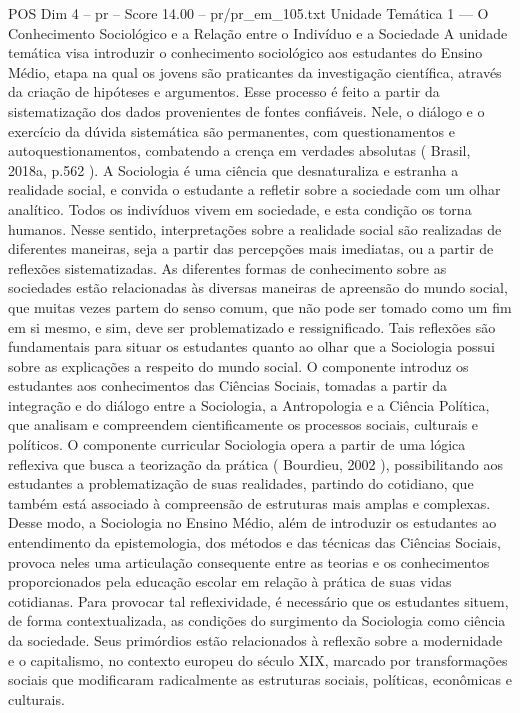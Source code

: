 \begin{textsample}{POS Dim 4 – pr – Score 14.00 – pr/pr\_em\_105.txt}  \label{ex:f4_pos_181}
Unidade Temática 1 — O Conhecimento Sociológico e a Relação entre o Indivíduo e a Sociedade A unidade temática visa introduzir o conhecimento sociológico aos estudantes do Ensino Médio, etapa na qual os jovens são praticantes da investigação científica, através da criação de hipóteses e argumentos.
Esse processo é feito a partir da sistematização dos dados provenientes de fontes confiáveis.
Nele, o diálogo e o exercício da dúvida sistemática são permanentes, com questionamentos e autoquestionamentos, combatendo a crença em verdades absolutas ( Brasil, 2018a, p.562 ).
A Sociologia é uma ciência que desnaturaliza e estranha a realidade social, e convida o estudante a refletir sobre a sociedade com um olhar analítico.
Todos os indivíduos vivem em sociedade, e esta condição os torna humanos.
Nesse sentido, interpretações sobre a realidade social são realizadas de diferentes maneiras, seja a partir das percepções mais imediatas, ou a partir de reflexões sistematizadas.
As diferentes formas de conhecimento sobre as sociedades estão relacionadas às diversas maneiras de apreensão do mundo social, que muitas vezes partem do senso comum, que não pode ser tomado como um fim em si mesmo, e sim, deve ser problematizado e ressignificado.
Tais reflexões são fundamentais para situar os estudantes quanto ao olhar que a Sociologia possui sobre as explicações a respeito do mundo social.
O componente introduz os estudantes aos conhecimentos das Ciências Sociais, tomadas a partir da integração e do diálogo entre a Sociologia, a Antropologia e a Ciência Política, que analisam e compreendem cientificamente os processos sociais, culturais e políticos.
O componente curricular Sociologia opera a partir de uma lógica reflexiva que busca a teorização da prática ( Bourdieu, 2002 ), possibilitando aos estudantes a problematização de suas realidades, partindo do cotidiano, que também está associado à compreensão de estruturas mais amplas e complexas.
Desse modo, a Sociologia no Ensino Médio, além de introduzir os estudantes ao entendimento da epistemologia, dos métodos e das técnicas das Ciências Sociais, provoca neles uma articulação consequente entre as teorias e os conhecimentos proporcionados pela educação escolar em relação à prática de suas vidas cotidianas.
Para provocar tal reflexividade, é necessário que os estudantes situem, de forma contextualizada, as condições do surgimento da Sociologia como ciência da sociedade.
Seus primórdios estão relacionados à reflexão sobre a modernidade e o capitalismo, no contexto europeu do século XIX, marcado por transformações sociais que modificaram radicalmente as estruturas sociais, políticas, econômicas e culturais.

\end{textsample}
